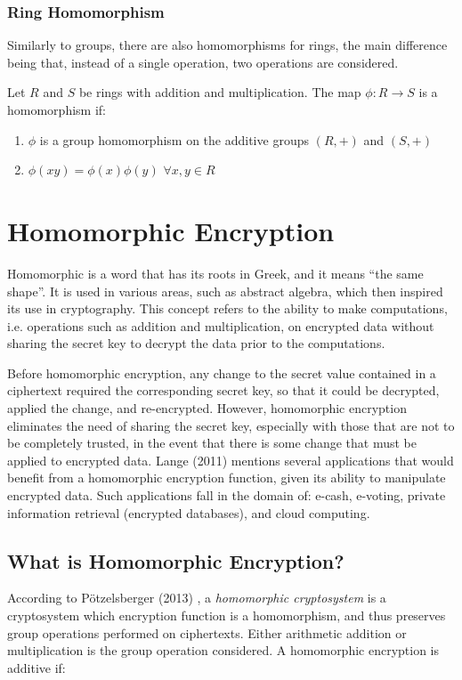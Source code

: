 \subsubsection{Ring Homomorphism}

Similarly to groups, there are also homomorphisms for rings, the main difference being that, instead of a single operation, two operations are considered.

Let $R$ and $S$ be rings with addition and multiplication. The map $\phi: R \rightarrow S$ is a homomorphism if:
\begin{enumerate}
\item $\phi$ is a group homomorphism on the additive groups $(R, +)$ and $(S,+)$
\item $\phi(xy) = \phi(x) \phi(y)$ $\forall x, y \in R$
\end{enumerate}

\section{Homomorphic Encryption}

Homomorphic is a word that has its roots in Greek, and it means ``the same shape''. It is used in various areas, such as abstract algebra, which then inspired its use in cryptography. This concept refers to the ability to make computations, i.e. operations such as addition and multiplication, on encrypted data without sharing the secret key to decrypt the data prior to the computations. 

Before homomorphic encryption, any change to the secret value contained in a ciphertext required the corresponding secret key, so that it could be decrypted, applied the change, and re-encrypted. However, homomorphic encryption eliminates the need of sharing the secret key, especially with those that are not to be completely trusted, in the event that there is some change that must be applied to encrypted data. 
Lange (2011) \cite{lange2011} mentions several applications that would benefit from a homomorphic encryption function, given its ability to manipulate encrypted data. Such applications fall in the domain of: e-cash, e-voting, private information retrieval (encrypted databases), and cloud computing.

\subsection{What is Homomorphic Encryption?}

According to P{\"o}tzelsberger (2013) \cite{potzelsberger2013kv}, a \textit{homomorphic cryptosystem} is a cryptosystem which encryption function is a homomorphism, and thus preserves group operations performed on ciphertexts. Either arithmetic addition or multiplication is the group operation considered.  A homomorphic encryption is additive if:

